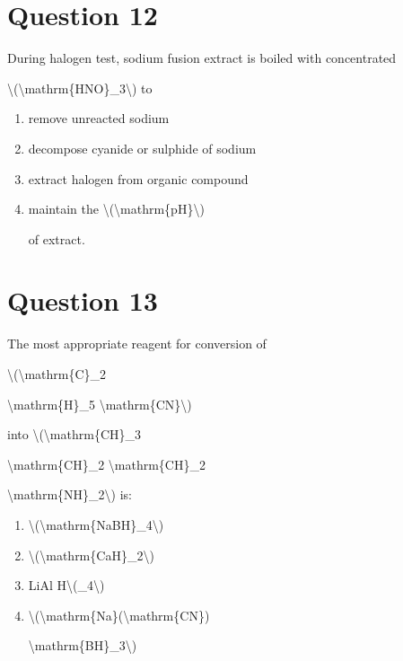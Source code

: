 \documentclass{article}
\begin{document}
\section*{Question 12}
During halogen test, sodium fusion extract is boiled with concentrated

\textbackslash(\textbackslash mathrm\{HNO\}\_3\textbackslash) to


\begin{enumerate}[label=(\alph*)]
\item remove unreacted sodium


\item decompose cyanide or sulphide of sodium


\item extract halogen from organic compound


\item maintain the \textbackslash(\textbackslash mathrm\{pH\}\textbackslash)

of extract.


\end{enumerate}
\newpage
\section*{Question 13}
The most appropriate reagent for conversion of

\textbackslash(\textbackslash mathrm\{C\}\_2

\textbackslash mathrm\{H\}\_5 \textbackslash mathrm\{CN\}\textbackslash)

into \textbackslash(\textbackslash mathrm\{CH\}\_3

\textbackslash mathrm\{CH\}\_2 \textbackslash mathrm\{CH\}\_2

\textbackslash mathrm\{NH\}\_2\textbackslash) is:


\begin{enumerate}[label=(\alph*)]
\item \textbackslash(\textbackslash mathrm\{NaBH\}\_4\textbackslash)


\item \textbackslash(\textbackslash mathrm\{CaH\}\_2\textbackslash)


\item LiAl H\textbackslash(\_4\textbackslash)


\item \textbackslash(\textbackslash mathrm\{Na\}(\textbackslash mathrm\{CN\})

\textbackslash mathrm\{BH\}\_3\textbackslash)


\end{enumerate}
\newpage
\end{document}
